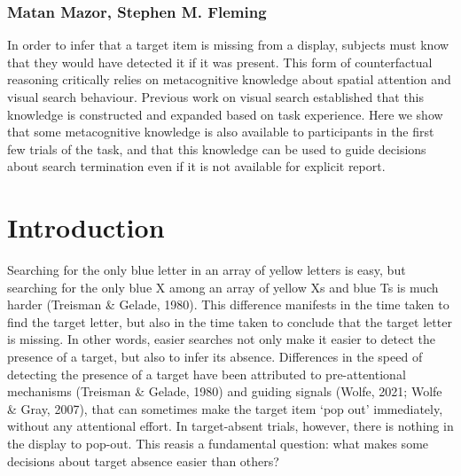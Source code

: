 \documentclass[12pt,twoside]{reedthesis}
\begin{document}
\hypertarget{matan-mazor-stephen-m.-fleming}{%
\subsubsection*{Matan Mazor, Stephen M. Fleming}\label{matan-mazor-stephen-m.-fleming}}

In order to infer that a target item is missing from a display, subjects must know that they would have detected it if it was present. This form of counterfactual reasoning critically relies on metacognitive knowledge about spatial attention and visual search behaviour. Previous work on visual search established that this knowledge is constructed and expanded based on task experience. Here we show that some metacognitive knowledge is also available to participants in the first few trials of the task, and that this knowledge can be used to guide decisions about search termination even if it is not available for explicit report.

\hypertarget{introduction-1}{%
\section{Introduction}\label{introduction-1}}

Searching for the only blue letter in an array of yellow letters is easy, but searching for the only blue X among an array of yellow Xs and blue Ts is much harder (Treisman \& Gelade, 1980). This difference manifests in the time taken to find the target letter, but also in the time taken to conclude that the target letter is missing. In other words, easier searches not only make it easier to detect the presence of a target, but also to infer its absence. Differences in the speed of detecting the presence of a target have been attributed to pre-attentional mechanisms (Treisman \& Gelade, 1980) and guiding signals (Wolfe, 2021; Wolfe \& Gray, 2007), that can sometimes make the target item `pop out' immediately, without any attentional effort. In target-absent trials, however, there is nothing in the display to pop-out. This reasis a fundamental question: what makes some decisions about target absence easier than others?
\end{document}
